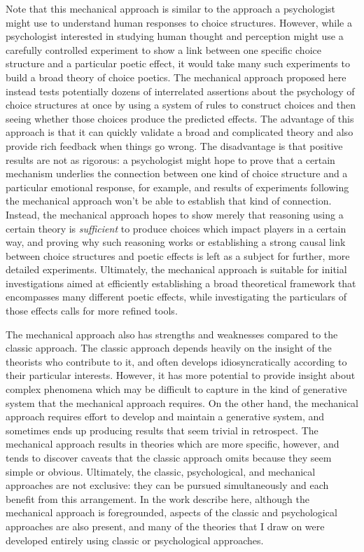 Note that this mechanical approach is similar to the approach a psychologist might use to understand human responses to choice structures.
%
However, while a psychologist interested in studying human thought and perception might use a carefully controlled experiment to show a link between one specific choice structure and a particular poetic effect, it would take many such experiments to build a broad theory of choice poetics.
%
The mechanical approach proposed here instead tests potentially dozens of interrelated assertions about the psychology of choice structures at once by using a system of rules to construct choices and then seeing whether those choices produce the predicted effects.
%
The advantage of this approach is that it can quickly validate a broad and complicated theory and also provide rich feedback when things go wrong.
%
The disadvantage is that positive results are not as rigorous: a psychologist might hope to prove that a certain mechanism underlies the connection between one kind of choice structure and a particular emotional response, for example, and results of experiments following the mechanical approach won't be able to establish that kind of connection.
%
Instead, the mechanical approach hopes to show merely that reasoning using a certain theory is \emph{sufficient} to produce choices which impact players in a certain way, and proving why such reasoning works or establishing a strong causal link between choice structures and poetic effects is left as a subject for further, more detailed experiments.
%
Ultimately, the mechanical approach is suitable for initial investigations aimed at efficiently establishing a broad theoretical framework that encompasses many different poetic effects, while investigating the particulars of those effects calls for more refined tools.


The mechanical approach also has strengths and weaknesses compared to the classic approach.
%
The classic approach depends heavily on the insight of the theorists who contribute to it, and often develops idiosyncratically according to their particular interests.
%
However, it has more potential to provide insight about complex phenomena which may be difficult to capture in the kind of generative system that the mechanical approach requires.
%
On the other hand, the mechanical approach requires effort to develop and maintain a generative system, and sometimes ends up producing results that seem trivial in retrospect.
%
The mechanical approach results in theories which are more specific, however, and tends to discover caveats that the classic approach omits because they seem simple or obvious.
%
Ultimately, the classic, psychological, and mechanical approaches are not exclusive: they can be pursued simultaneously and each benefit from this arrangement.
%
In the work describe here, although the mechanical approach is foregrounded, aspects of the classic and psychological approaches are also present, and many of the theories that I draw on were developed entirely using classic or psychological approaches.


